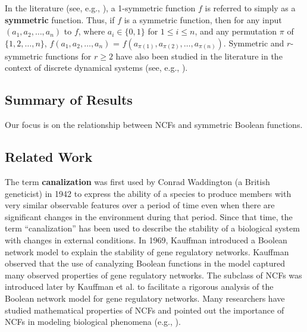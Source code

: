 In the literature (see, e.g., \cite{Crama-Hammer-2011,HT-2016,Toth-etal-1977}),
a 1-symmetric function $f$ is referred to simply
as a \textbf{symmetric} function.
Thus, if $f$ is a symmetric function, then for any
input $(a_1, a_2, \ldots, a_n)$ to $f$, where $a_i \in \{0,1\}$ for
$1 \leq i \leq n$, and any permutation $\pi$ of $\{1, 2, \ldots, n\}$,
$f(a_1, a_2, \ldots, a_n)$ = $f(a_{\pi(1)}, a_{\pi(2)}, \ldots, a_{\pi(n)})$.
Symmetric and $r$-symmetric functions for $r \geq 2$ have also been
studied in the literature in the context of discrete
dynamical systems (see, e.g., 
\cite{Barrett-etal-2007,Rosenkrantz-etal-2015,MR-2007}).


\subsection{Summary of Results}
\label{sse:contrib}

Our focus is on the relationship between NCFs and symmetric
Boolean functions.


\subsection{Related Work}
\label{sse:related}

The term \textbf{canalization} was first used by
Conrad Waddington (a British geneticist)
in 1942 \cite{Waddington-1942}
to express the ability of a species
to produce members with very similar observable features over a period
of time even when there are significant changes in the environment
during that period.
Since that time, the term ``canalization'' has been used to describe
the stability of a biological system with changes
in external conditions.
In 1969, Kauffman \cite{Kauffman-1969} introduced a Boolean network model
to explain the stability of gene regulatory networks.
Kauffman observed that the use of canalyzing Boolean
functions in the model captured many observed properties of
gene regulatory networks.
The subclass of NCFs was
introduced later by Kauffman et al. \cite{Kauffman-etal-2003} 
to facilitate a rigorous analysis of the Boolean network model
for gene regulatory networks.
Many researchers have studied mathematical properties of NCFs and
pointed out the importance of NCFs in modeling biological
phenomena (e.g., \cite{Layne-2011,
Layne-etal-2012,Li-etal-2011,Li-etal-2012,Li-etal-2013}).

